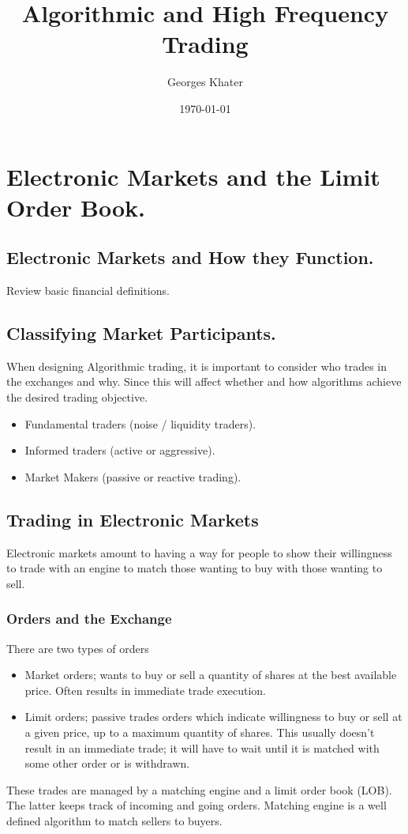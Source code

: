 \documentclass[11pt,a4paper]{article}
\title{\LARGE\bfseries Algorithmic and High Frequency Trading}
\author{Georges Khater}
\date{\today}
\theoremstyle{definition}
\theoremstyle{plain}
\theoremstyle{remark}
\newcommand{\1}{\mathbbm{1}}
\begin{document}
\maketitle
\tableofcontents
\bigskip

\section{Electronic Markets and the Limit Order Book.}

\subsection{Electronic Markets and How they Function.} 
Review basic financial definitions. 

\subsection{Classifying Market Participants.}
When designing Algorithmic trading, it is important to consider who trades in the exchanges and why. Since 
this will affect whether and how algorithms achieve the desired trading objective.  
\begin{itemize}
    \item Fundamental traders (noise / liquidity traders). 
    \item Informed traders (active or aggressive). 
    \item Market Makers (passive or reactive trading). 
\end{itemize}

\subsection{Trading in Electronic Markets} 
Electronic markets amount to having a way for people to show their willingness to trade with an engine to match those 
wanting to buy with those wanting to sell. 

\subsubsection{Orders and the Exchange}
There are two types of orders
\begin{itemize}
    \item Market orders; wants to buy or sell a quantity of shares 
    at the best available price. Often results in immediate trade execution.

    \item Limit orders; passive trades orders which indicate willingness to 
    buy or sell at a given price, up to a maximum quantity of shares. 
    This usually doesn't result in an immediate trade; it will have to wait until it is matched with some other 
    order or is withdrawn. 
\end{itemize}
These trades are managed by a matching engine and a limit order book (LOB). 
The latter keeps track of incoming and going orders. Matching engine is a well defined 
algorithm to match sellers to buyers. 
\end{document}

